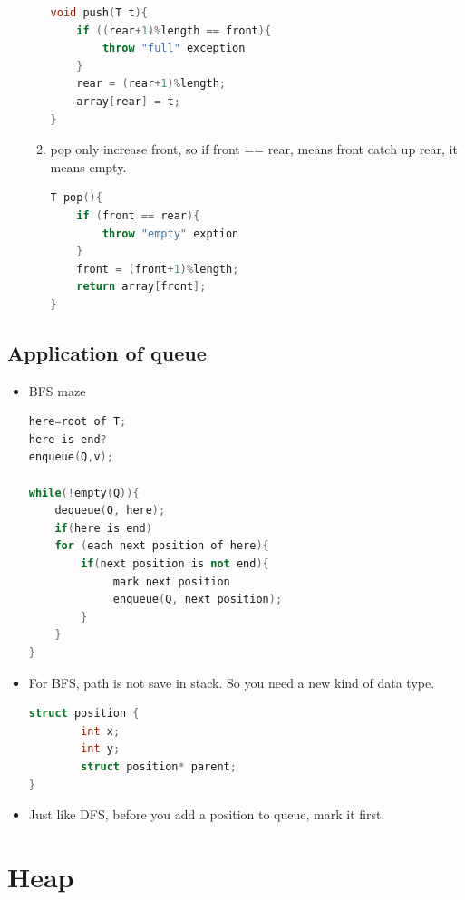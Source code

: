\documentclass[a4paper,11pt,twoside]{book}
\begin{document}
\begin{itemize}
\begin{enumerate}
\begin{lstlisting}[frame=single, language=c++]
void push(T t){
	if ((rear+1)%length == front){
		throw "full" exception
	}
	rear = (rear+1)%length;
	array[rear] = t;
}	
\end{lstlisting}

\item pop only increase front, so if front == rear, means front catch up rear, it means empty.
\begin{lstlisting}[frame=single, language=c++]
T pop(){
	if (front == rear){
		throw "empty" exption
	}
	front = (front+1)%length;
	return array[front];
}
\end{lstlisting}

\end{enumerate}

\end{itemize}


\subsection{Application of queue}
\begin{itemize}
\item  BFS maze 
\begin{lstlisting}[frame=single, language=c++]
here=root of T;
here is end?
enqueue(Q,v);

while(!empty(Q)){
    dequeue(Q, here);
    if(here is end)
    for (each next position of here){
        if(next position is not end){
             mark next position
             enqueue(Q, next position);
        }
    }
}
\end{lstlisting}

\item For BFS, path is not save in stack. So you need a new kind of data type. 
\begin{lstlisting}[frame=single, language=c++]
struct position {
        int x;
        int y;
        struct position* parent;
}
\end{lstlisting}
\item Just like DFS, before you add a position to queue, mark it first. 

\end{itemize}



\section{Heap}
\end{document}
